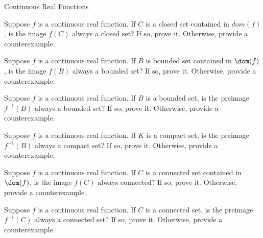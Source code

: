 \begin{section}{Continuous Real Functions}
\begin{problem}
Suppose $f$ is a continuous real function. If $C$ is a closed set contained in $dom(f)$, is the image $f(C)$ always a closed set?  If so, prove it.  Otherwise, provide a counterexample.
\end{problem}

\begin{problem}
Suppose $f$ is a continuous real function. If $B$ is bounded set contained in $\dom(f)$, is the image $f(B)$ always a bounded set?  If so, prove it.  Otherwise, provide a counterexample.
\end{problem}

\begin{problem}
Suppose $f$ is a continuous real function. If $B$ is a bounded set, is the preimage $f^{-1}(B)$ always a bounded set? If so, prove it.  Otherwise, provide a counterexample.
\end{problem}

\begin{problem}
Suppose $f$ is a continuous real function. If $K$ is a compact set, is the preimage $f^{-1}(B)$ always a compact set? If so, prove it.  Otherwise, provide a counterexample.
\end{problem}




\begin{problem}\label{prob:continuous image of connected set}
Suppose $f$ is a continuous real function. If $C$ is a connected set contained in $\dom(f)$, is the image $f(C)$ always connected?  If so, prove it.  Otherwise, provide a counterexample.
\end{problem}

\begin{problem}
Suppose $f$ is a continuous real function. If $C$ is a connected set, is the preimage $f^{-1}(C)$ always a connected set? If so, prove it.  Otherwise, provide a counterexample.
\end{problem}


\end{section}
